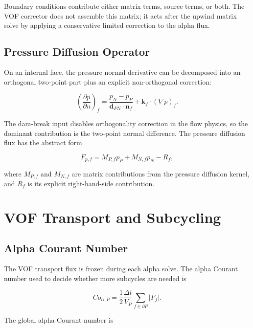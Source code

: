 \documentclass[11pt]{article}
\newcommand{\grad}{\nabla}
\begin{document}
Boundary conditions contribute either matrix terms, source terms, or both.  The
VOF corrector does not assemble this matrix; it acts after the upwind matrix
solve by applying a conservative limited correction to the alpha flux.

\subsection{Pressure Diffusion Operator}

On an internal face, the pressure normal derivative can be decomposed into an
orthogonal two-point part plus an explicit non-orthogonal correction:

\begin{equation}
  \left(\frac{\partial p}{\partial n}\right)_f
  =
  \frac{p_N-p_P}{\mathbf{d}_{PN}\cdot\mathbf{n}_f}
  +
  \mathbf{k}_f\cdot(\grad p)_f.
\end{equation}

The dam-break input disables orthogonality correction in the flow physics, so
the dominant contribution is the two-point normal difference.  The pressure
diffusion flux has the abstract form

\begin{equation}
  F_{p,f}
  =
  M_{P,f}p_P+M_{N,f}p_N-R_f,
  \label{eq:pressure-discrete-flux}
\end{equation}

where \(M_{P,f}\) and \(M_{N,f}\) are matrix contributions from the pressure
diffusion kernel, and \(R_f\) is its explicit right-hand-side contribution.

\section{VOF Transport and Subcycling}

\subsection{Alpha Courant Number}

The VOF transport flux is frozen during each alpha solve.  The alpha Courant
number used to decide whether more subcycles are needed is

\begin{equation}
  Co_{\alpha,P}
  =
  \frac{1}{2}
  \frac{\Delta t}{V_P}
  \sum_{f\in\partial P}
  |F_f|.
  \label{eq:alpha-courant}
\end{equation}

The global alpha Courant number is
\end{document}
